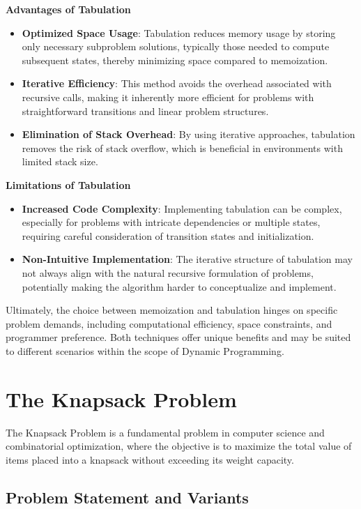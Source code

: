 \documentclass[12pt]{book} %
\begin{document}
\textbf{Advantages of Tabulation}
\begin{itemize}
    \item \textbf{Optimized Space Usage}: Tabulation reduces memory usage by storing only necessary subproblem solutions, typically those needed to compute subsequent states, thereby minimizing space compared to memoization.
    \item \textbf{Iterative Efficiency}: This method avoids the overhead associated with recursive calls, making it inherently more efficient for problems with straightforward transitions and linear problem structures.
    \item \textbf{Elimination of Stack Overhead}: By using iterative approaches, tabulation removes the risk of stack overflow, which is beneficial in environments with limited stack size.
\end{itemize}

\textbf{Limitations of Tabulation}
\begin{itemize}
    \item \textbf{Increased Code Complexity}: Implementing tabulation can be complex, especially for problems with intricate dependencies or multiple states, requiring careful consideration of transition states and initialization.
    \item \textbf{Non-Intuitive Implementation}: The iterative structure of tabulation may not always align with the natural recursive formulation of problems, potentially making the algorithm harder to conceptualize and implement.
\end{itemize}

Ultimately, the choice between memoization and tabulation hinges on specific problem demands, including computational efficiency, space constraints, and programmer preference. Both techniques offer unique benefits and may be suited to different scenarios within the scope of Dynamic Programming.


\section{The Knapsack Problem}

The Knapsack Problem is a fundamental problem in computer science and combinatorial optimization, where the objective is to maximize the total value of items placed into a knapsack without exceeding its weight capacity.

\subsection{Problem Statement and Variants}
\end{document}
